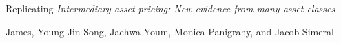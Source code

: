 {
\fontsize{14}{16}\selectfont
\textnormal{Replicating} \textit{Intermediary asset pricing: New evidence from many asset classes}
}

\bigskip

{
\fontsize{12}{14}\selectfont
James, Young Jin Song, Jaehwa Youm, Monica Panigrahy, and Jacob Simeral
}